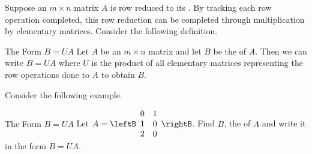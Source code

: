 Suppose an $m \times n$ matrix $A$ is row reduced to its \rref. By tracking each row operation completed, this row reduction can be completed through multiplication by elementary matrices. Consider the following definition.

\begin{definition}{The Form $B=UA$}\label{def:formbua}
Let $A$ be an $m \times n$ matrix and let $B$ be the \rref \;of $A$. Then we can write $B = UA$ where $U$ is the product of all elementary matrices representing the row operations done to $A$ to obtain $B$. 
\end{definition}

Consider the following example.

\begin{example}{The Form $B=UA$}\label{exa:formbua}
Let $A = \leftB
\begin{array}{rr}
0 & 1 \\
1 & 0 \\
2 & 0
\end{array}
\rightB$. Find $B$, the \rref \;of $A$ and write it in the form $B=UA$.
\end{example}

